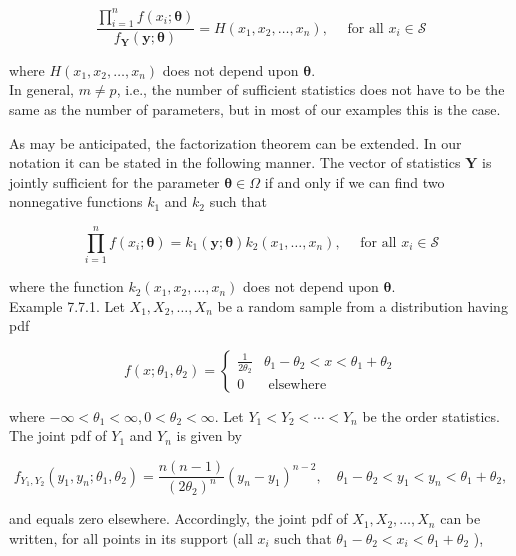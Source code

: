 $$
\frac{\prod_{i=1}^{n} f\left(x_{i} ; \boldsymbol{\theta}\right)}{f_{\mathbf{Y}}(\mathbf{y} ; \boldsymbol{\theta})}=H\left(x_{1}, x_{2}, \ldots, x_{n}\right), \quad \text { for all } x_{i} \in \mathcal{S}
$$

where $H\left(x_{1}, x_{2}, \ldots, x_{n}\right)$ does not depend upon $\boldsymbol{\theta}$.\\
In general, $m \neq p$, i.e., the number of sufficient statistics does not have to be the same as the number of parameters, but in most of our examples this is the case.

As may be anticipated, the factorization theorem can be extended. In our notation it can be stated in the following manner. The vector of statistics $\mathbf{Y}$ is jointly sufficient for the parameter $\boldsymbol{\theta} \in \Omega$ if and only if we can find two nonnegative functions $k_{1}$ and $k_{2}$ such that


\begin{equation*}
\prod_{i=1}^{n} f\left(x_{i} ; \boldsymbol{\theta}\right)=k_{1}(\mathbf{y} ; \boldsymbol{\theta}) k_{2}\left(x_{1}, \ldots, x_{n}\right), \quad \text { for all } x_{i} \in \mathcal{S} \tag{7.7.1}
\end{equation*}


where the function $k_{2}\left(x_{1}, x_{2}, \ldots, x_{n}\right)$ does not depend upon $\boldsymbol{\theta}$.\\
Example 7.7.1. Let $X_{1}, X_{2}, \ldots, X_{n}$ be a random sample from a distribution having pdf

$$
f\left(x ; \theta_{1}, \theta_{2}\right)= \begin{cases}\frac{1}{2 \theta_{2}} & \theta_{1}-\theta_{2}<x<\theta_{1}+\theta_{2} \\ 0 & \text { elsewhere }\end{cases}
$$

where $-\infty<\theta_{1}<\infty, 0<\theta_{2}<\infty$. Let $Y_{1}<Y_{2}<\cdots<Y_{n}$ be the order statistics. The joint pdf of $Y_{1}$ and $Y_{n}$ is given by

$$
f_{Y_{1}, Y_{2}}\left(y_{1}, y_{n} ; \theta_{1}, \theta_{2}\right)=\frac{n(n-1)}{\left(2 \theta_{2}\right)^{n}}\left(y_{n}-y_{1}\right)^{n-2}, \quad \theta_{1}-\theta_{2}<y_{1}<y_{n}<\theta_{1}+\theta_{2},
$$

and equals zero elsewhere. Accordingly, the joint pdf of $X_{1}, X_{2}, \ldots, X_{n}$ can be written, for all points in its support (all $x_{i}$ such that $\theta_{1}-\theta_{2}<x_{i}<\theta_{1}+\theta_{2}$ ),

